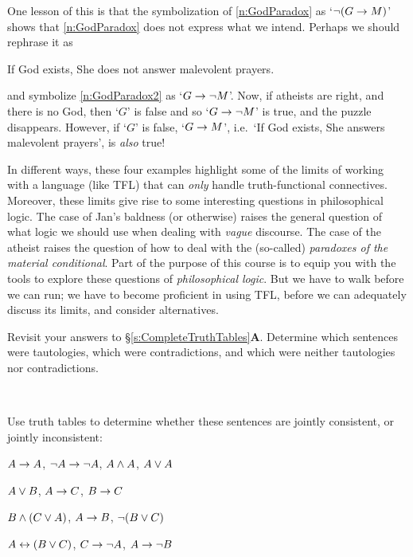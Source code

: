         One lesson of this is that the symbolization of \ref{n:GodParadox} as `$\neg(G \rightarrow M)$' shows that \ref{n:GodParadox} does not express what we intend. Perhaps we should rephrase it as
        	\begin{earg}
                  \setcounter{eargnum}{2}	
                \item\label{n:GodParadox2} If God exists, She does not answer malevolent prayers.
  \end{earg}
and symbolize \ref{n:GodParadox2} as `$G \rightarrow \neg M$'.  Now, if atheists are right, and there is no God, then `$G$' is false and so `$G \rightarrow \neg M$' is true, and the puzzle disappears. However, if `$G$' is false, `$G \rightarrow M$', i.e.\ `If God exists, She answers malevolent prayers', is \emph{also} true!
                
In different ways, these four examples highlight some of the limits of working with a language (like TFL) that can \emph{only} handle truth-functional connectives. Moreover, these limits give rise to some interesting questions in philosophical logic. The case of Jan's baldness (or otherwise) raises the general question of what logic we should use when dealing with \emph{vague} discourse. The case of the atheist raises the question of how to deal with the (so-called) \emph{paradoxes of the material conditional}. Part of the purpose of this course is to equip you with the tools to explore these questions of \emph{philosophical logic}. But we have to walk before we can run; we have to become proficient in using TFL, before we can adequately discuss its limits, and consider alternatives. 




\practiceproblems
\problempart
Revisit your answers to \S\ref{s:CompleteTruthTables}\textbf{A}. Determine which sentences were tautologies, which were contradictions, and which were neither tautologies nor contradictions.
\solutions

\

\problempart
\label{pr.TT.consistent}
Use truth tables to determine whether these sentences are jointly consistent, or jointly inconsistent:
\begin{earg}
\item $A\rightarrow A$, $\neg A \rightarrow \neg A$, $A\wedge A$, $A\vee A$ %
\item $A\vee B$, $A\rightarrow C$, $B\rightarrow C$ %
\item $B\wedge(C\vee A)$, $A\rightarrow B$, $\neg(B\vee C)$  %
\item $A\leftrightarrow(B\vee C)$, $C\rightarrow \neg A$, $A\rightarrow \neg B$ %
\end{earg}


